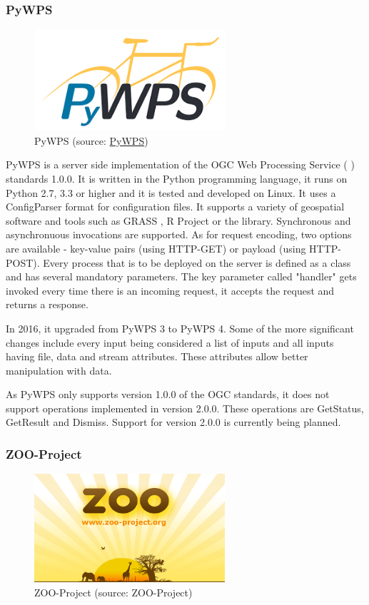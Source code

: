 \subsubsection{PyWPS}
\begin{figure}[H] \centering
      \includegraphics[width=200pt]{./pictures/pywps.png}
      \caption[PyWPS logo]{PyWPS (source:
\href{http://pywps.org/images/pywps.png}{PyWPS})}
      \label{fig:PyWPS}
  \end{figure}

PyWPS is a server side implementation of the OGC Web Processing
Service ( ) standards 1.0.0. It is written in the Python
programming language, it runs on Python 2.7, 3.3 or higher and it is
tested and developed on Linux. \cite{pywpsinfo} It uses a ConfigParser format for
configuration files.\cite{pywpsconf} It supports a variety of geospatial software and
tools such as GRASS , R Project or the  library. Synchronous
and asynchronuous invocations are supported. As for request encoding,
two options are available - key-value pairs (using HTTP-GET) or 
payload (using HTTP-POST). Every process that is to be deployed on the
server is defined as a class and has several mandatory parameters. The
key parameter called "handler" gets invoked every time there is an
incoming request, it accepts the request and returns a response.

In 2016, it upgraded from PyWPS 3 to PyWPS 4. Some of the more
significant changes include every input being considered a list of
inputs and all inputs having file, data and stream attributes. \cite{pywps3to4} These
attributes allow better manipulation with data.
	
As PyWPS only supports version 1.0.0 of the OGC  standards, it does
not support operations implemented in version 2.0.0. These operations
are GetStatus, GetResult and Dismiss. Support for version 2.0.0 is
currently being planned.\cite{pywps}
 

\subsubsection{ZOO-Project}
\begin{figure}[H] \centering
      \includegraphics[width=200pt]{./pictures/zoo.png}
      \caption[ZOO-Project logo]{ZOO-Project (source: ZOO-Project)}
      \label{fig:ZOO-Project}
  \end{figure}

